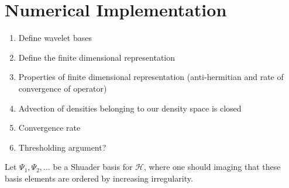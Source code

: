 \section{Numerical Implementation}\label{sec:Implementation}

\begin{enumerate}
	\item Define wavelet bases
	\item Define the finite dimensional representation
	\item Properties of finite dimensional representation (anti-hermitian and rate of convergence of operator)
	\item Advection of densities belonging to our density space is closed
	\item Convergence rate
	\item Thresholding argument?
\end{enumerate}

Let $\Psi_1, \Psi_2, \dots$ be a Shuader basis for $\mathcal{H}$, where one should imaging that these basis elements are ordered by increasing irregularity.